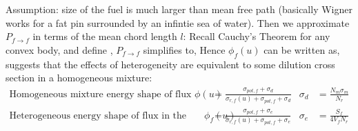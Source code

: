 \documentclass{school-22.211-notes}
\begin{document}
Assumption: size of the fuel is much larger than mean free path (basically Wigner works for a fat pin surrounded by an infintie sea of water). Then we approximate $P_{f\to f}$ in terms of the mean chord length $l$: 
Recall Cauchy's Theorem for any convex body, 
and define ,
$P_{f\to f}$ simplifies to, 
Hence $\phi_f(u)$ can be written as, 
 suggests that the effects of heterogeneity are equivalent to some dilution cross section in a homogeneous mixture:
\begin{align}
\mbox{Homogeneous mixture energy shape of flux } \phi(u) &= \frac{\sigma_{pot, f} + \sigma_d}{\sigma_{r,f} (u) + \sigma_{pot, f} + \sigma_d}   & \sigma_d &= \frac{N_m \sigma_m}{N_r}  \\
\mbox{Heterogeneous energy shape of flux in the fuel } \phi_f(u) &= \frac{\sigma_{pot, f} + \sigma_e}{\sigma_{r,f} (u) + \sigma_{pot, f} + \sigma_e}   & \sigma_e &= \frac{S_f}{4 V_f N_r} 
\end{align}
\end{document}

